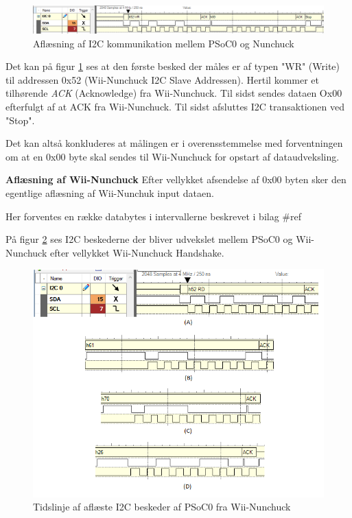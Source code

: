 \begin{figure}[H]
	\centering
	\includegraphics[width=\textwidth]{Test/images/writerequest}
	\caption{Aflæsning af I2C kommunikation mellem PSoC0 og Nunchuck}
	\label{fig:NunchuckWriteValues}
\end{figure}

\noindent Det kan på figur \ref{fig:NunchuckWriteValues} ses at den første besked der måles er af typen "WR" (Write) til addressen 0x52 (Wii-Nunchuck I2C Slave Addressen). Hertil kommer et tilhørende \textit{ACK} (Acknowledge) fra Wii-Nunchuck. Til sidst sendes dataen Ox00 efterfulgt af at ACK fra Wii-Nunchuck. Til sidst afsluttes I2C transaktionen ved "Stop".\newline

\noindent Det kan altså konkluderes at målingen er i overensstemmelse med forventningen om at en 0x00 byte skal sendes til Wii-Nunchuck for opstart af dataudveksling.\newline


\noindent\textbf{Aflæsning af Wii-Nunchuck}\newline
\noindent Efter vellykket afsendelse af 0x00 byten sker den egentlige aflæsning af Wii-Nunchuk input dataen.\newline

\noindent Her forventes en række databytes i intervallerne beskrevet i bilag \#ref \cite{Nunchuck} \newline

\noindent På figur \ref{fig:NunchuckReadValues} ses I2C beskederne der bliver udvekslet mellem PSoC0 og Wii-Nunchuck efter vellykket Wii-Nunchuck Handshake. \newline

\begin{figure}[H]
	\centering
	\includegraphics[width=\textwidth]{Test/images/readvaluesEdited.png}
	\caption{Tidslinje af aflæste I2C beskeder af PSoC0 fra Wii-Nunchuck}
	\label{fig:NunchuckReadValues}
\end{figure}

